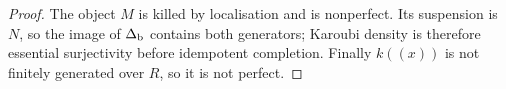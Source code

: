 \begin{proof}
The object \(M\) is killed by localisation and is nonperfect.  Its suspension is \(N\), so the image of \(\Delta_{\mathrm b}\) contains both generators; Karoubi density is therefore essential surjectivity before idempotent completion.  Finally \(k((x))\) is not finitely generated over \(R\), so it is not perfect.
\end{proof}